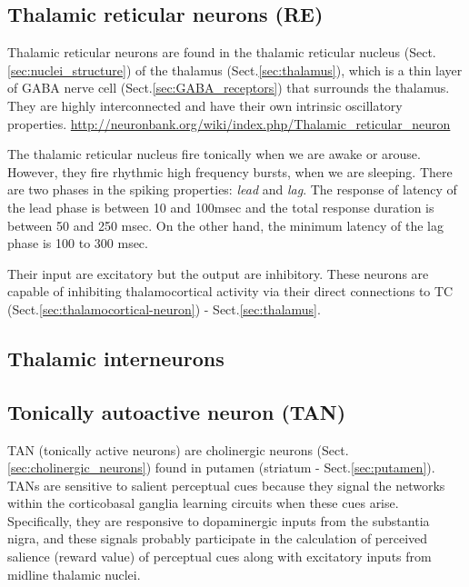 \subsection{Thalamic reticular neurons (RE)}
\label{sec:reticular-neuron}

Thalamic reticular neurons are found in the thalamic reticular nucleus
(Sect.\ref{sec:nuclei_structure}) of the thalamus (Sect.\ref{sec:thalamus}), which is a thin
layer of GABA nerve cell (Sect.\ref{sec:GABA_receptors}) that surrounds the thalamus.
They are highly interconnected and have their own intrinsic oscillatory
properties. 
\url{http://neuronbank.org/wiki/index.php/Thalamic_reticular_neuron}

The thalamic reticular nucleus fire tonically when we are awake or arouse.
However, they fire rhythmic high frequency bursts, when we are sleeping.
There are two phases in the spiking properties: {\it lead} and {\it
lag}.
The response of latency of the lead phase is between 10 and 100msec and the
total response duration is between 50 and 250 msec. On the other hand, the
minimum latency of the lag phase is 100 to 300 msec.

Their input are excitatory but the output are inhibitory.
These neurons are capable of inhibiting thalamocortical activity via their
direct connections to TC (Sect.\ref{sec:thalamocortical-neuron}) -
Sect.\ref{sec:thalamus}.
  

\subsection{Thalamic interneurons}
\label{sec:thalamic-interneurons}
 

\subsection{Tonically autoactive neuron (TAN)}
\label{sec:tonically-autoactivated-neuron}
\label{sec:TAN-neuron}

TAN (tonically active neurons) are cholinergic neurons
(Sect.\ref{sec:cholinergic_neurons}) found in putamen (striatum -
Sect.\ref{sec:putamen}). TANs are sensitive to   salient perceptual cues because
  they   signal   the networks   within   the corticobasal   ganglia learning
circuits  when  these  cues  arise. Specifically,  they  are responsive to
dopaminergic inputs from the substantia nigra,  and  these  signals  probably 
participate  in  the calculation  of  perceived  salience  (reward  value)  of
perceptual  cues  along  with  excitatory   inputs  from midline thalamic
nuclei.

